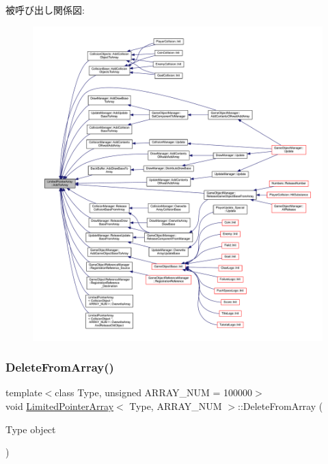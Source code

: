 被呼び出し関係図\+:\nopagebreak
\begin{figure}[H]
\begin{center}
\leavevmode
\includegraphics[width=350pt]{class_limited_pointer_array_a57eb08357204668710021965425f4f46_icgraph}
\end{center}
\end{figure}
\mbox{\label{class_limited_pointer_array_a02cfaed541d27980883ec9eb90ad3813}} 
\subsubsection{\texorpdfstring{Delete\+From\+Array()}{DeleteFromArray()}}
{\footnotesize\ttfamily template$<$class Type, unsigned A\+R\+R\+A\+Y\+\_\+\+N\+UM = 100000$>$ \\
void \mbox{\hyperlink{class_limited_pointer_array}{Limited\+Pointer\+Array}}$<$ Type, A\+R\+R\+A\+Y\+\_\+\+N\+UM $>$\+::Delete\+From\+Array (\begin{DoxyParamCaption}\item[{Type}]{object }\end{DoxyParamCaption})\hspace{0.3cm}{\ttfamily [inline]}}



